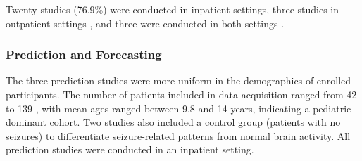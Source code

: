 Twenty studies (76.9\%) were conducted in inpatient settings, three studies in outpatient settings \cite{Chowdhury2022-bi,Wang2022-lt,Dong2022-oo}, and three were conducted in both settings \cite{Wang2025-my,Regalia2019-ch,Nasseri2021-xn}. 

\subsubsection{Prediction and Forecasting}
The three prediction studies were more uniform in the demographics of enrolled participants. The number of patients included in data acquisition ranged from 42 \cite{Vieluf2023-ta} to 139 \cite{Vieluf2023-zv}, with mean ages ranged between 9.8 \cite{Meisel2020-ii} and 14 \cite{Vieluf2023-ta} years, indicating a pediatric-dominant cohort. Two studies \cite{Vieluf2023-zv,Vieluf2023-ta} also included a control group (patients with no seizures) to differentiate seizure-related patterns from normal brain activity. All prediction studies were conducted in an inpatient setting.